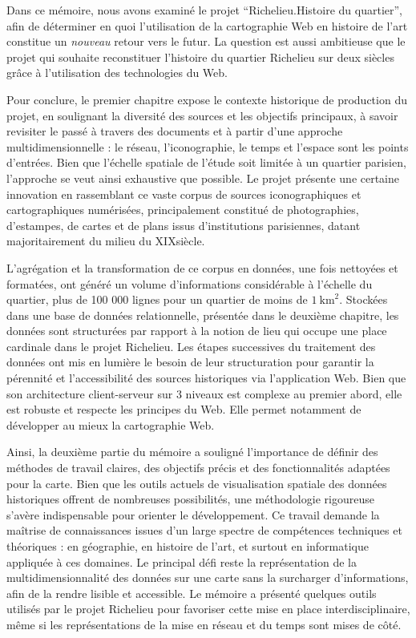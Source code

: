 Dans ce mémoire, nous avons examiné le projet \enquote{Richelieu.Histoire du quartier}, afin de déterminer en quoi l'utilisation de la cartographie Web en histoire de l'art constitue un \textit{nouveau} retour vers le futur. La question est aussi ambitieuse que le projet qui souhaite reconstituer l'histoire du quartier Richelieu sur deux siècles grâce à l'utilisation des technologies du Web. 

Pour conclure, le premier chapitre expose le contexte historique de production du projet, en soulignant la diversité des sources et les objectifs principaux, à savoir revisiter le passé à travers des documents et à partir d'une approche multidimensionnelle : le réseau, l'iconographie, le temps et l'espace sont les points d'entrées. Bien que l’échelle spatiale de l’étude soit limitée à un quartier parisien, l'approche se veut ainsi exhaustive que possible. Le projet présente une certaine innovation en rassemblant ce vaste corpus de sources iconographiques et cartographiques numérisées, principalement constitué de photographies, d’estampes, de cartes et de plans issus d’institutions parisiennes, datant majoritairement du milieu du XIX\ieme  siècle. 

L'agrégation et la transformation de ce corpus en données, une fois nettoyées et formatées, ont généré un volume d'informations considérable à l’échelle du quartier, plus de 100 000 lignes pour un quartier de moins de $1~\text{km}^2$. Stockées dans une base de données relationnelle, présentée dans le deuxième chapitre, les données sont structurées par rapport à la notion de lieu qui occupe une place cardinale dans le projet Richelieu. Les étapes successives du traitement des données ont mis en lumière le besoin de leur structuration pour garantir la pérennité et l’accessibilité des sources historiques via l'application Web. Bien que son architecture client-serveur sur 3 niveaux est complexe au premier abord, elle est robuste et respecte les principes du Web. Elle permet notamment de développer au mieux la cartographie Web. 

Ainsi, la deuxième partie du mémoire a souligné l'importance de définir des méthodes de travail claires, des objectifs précis et des fonctionnalités adaptées pour la carte. Bien que les outils actuels de visualisation spatiale des données historiques offrent de nombreuses possibilités, une méthodologie rigoureuse s'avère indispensable pour orienter le développement. Ce travail demande la maîtrise de connaissances issues d'un large spectre de compétences techniques et théoriques : en géographie, en histoire de l'art, et surtout en informatique appliquée à ces domaines. Le principal défi reste la représentation de  la multidimensionnalité des données sur une carte sans la surcharger d'informations, afin de la rendre lisible et accessible. Le mémoire a présenté quelques outils utilisés par le projet Richelieu pour favoriser cette mise en place interdisciplinaire, même si les représentations de la mise en réseau et du temps sont mises de côté. 

